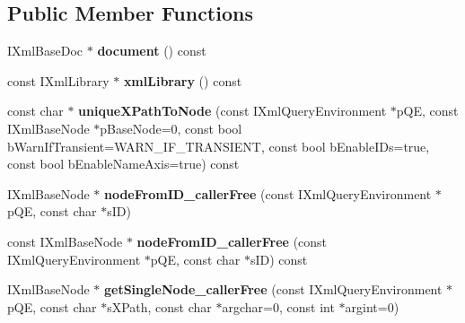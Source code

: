 \subsection*{\-Public \-Member \-Functions}
\begin{DoxyCompactItemize}
\item 
\hypertarget{classgeneral__server_1_1XmlBaseNode_aff8c5c51d34c2995e0a26d27ac8d6502}{\-I\-Xml\-Base\-Doc $\ast$ {\bfseries document} () const }\label{classgeneral__server_1_1XmlBaseNode_aff8c5c51d34c2995e0a26d27ac8d6502}

\item 
\hypertarget{classgeneral__server_1_1XmlBaseNode_a368da9adfce3b878159e61de533a6c84}{const \-I\-Xml\-Library $\ast$ {\bfseries xml\-Library} () const }\label{classgeneral__server_1_1XmlBaseNode_a368da9adfce3b878159e61de533a6c84}

\item 
\hypertarget{classgeneral__server_1_1XmlBaseNode_ad2781438b83528a634579b82877ef0df}{const char $\ast$ {\bfseries unique\-X\-Path\-To\-Node} (const \-I\-Xml\-Query\-Environment $\ast$p\-Q\-E, const \-I\-Xml\-Base\-Node $\ast$p\-Base\-Node=0, const bool b\-Warn\-If\-Transient=\-W\-A\-R\-N\-\_\-\-I\-F\-\_\-\-T\-R\-A\-N\-S\-I\-E\-N\-T, const bool b\-Enable\-I\-Ds=true, const bool b\-Enable\-Name\-Axis=true) const }\label{classgeneral__server_1_1XmlBaseNode_ad2781438b83528a634579b82877ef0df}

\item 
\hypertarget{classgeneral__server_1_1XmlBaseNode_a25887ece8e07ed5648e7bb78d77227cd}{\-I\-Xml\-Base\-Node $\ast$ {\bfseries node\-From\-I\-D\-\_\-caller\-Free} (const \-I\-Xml\-Query\-Environment $\ast$p\-Q\-E, const char $\ast$s\-I\-D)}\label{classgeneral__server_1_1XmlBaseNode_a25887ece8e07ed5648e7bb78d77227cd}

\item 
\hypertarget{classgeneral__server_1_1XmlBaseNode_a901ec09fa3f7fcb66de15f68ca277810}{const \-I\-Xml\-Base\-Node $\ast$ {\bfseries node\-From\-I\-D\-\_\-caller\-Free} (const \-I\-Xml\-Query\-Environment $\ast$p\-Q\-E, const char $\ast$s\-I\-D) const }\label{classgeneral__server_1_1XmlBaseNode_a901ec09fa3f7fcb66de15f68ca277810}

\item 
\hypertarget{classgeneral__server_1_1XmlBaseNode_a2839a9a16a3d8741d3a278b4170387c0}{\-I\-Xml\-Base\-Node $\ast$ {\bfseries get\-Single\-Node\-\_\-caller\-Free} (const \-I\-Xml\-Query\-Environment $\ast$p\-Q\-E, const char $\ast$s\-X\-Path, const char $\ast$argchar=0, const int $\ast$argint=0)}\label{classgeneral__server_1_1XmlBaseNode_a2839a9a16a3d8741d3a278b4170387c0}


\end{DoxyCompactItemize}
